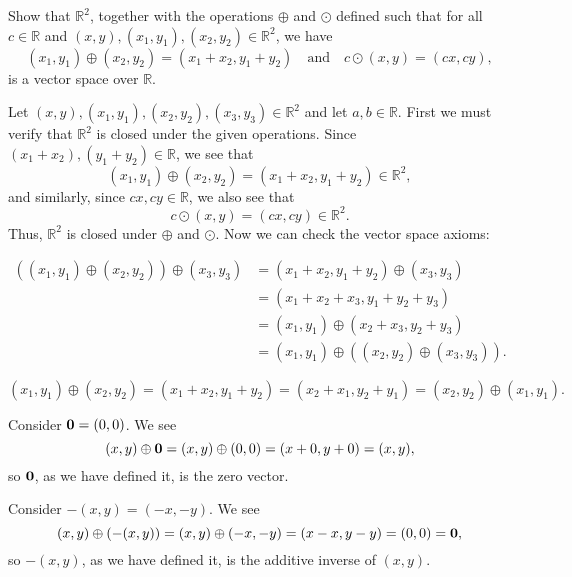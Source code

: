 \begin{example}
Show that $ \mathbb{R}^2 $, together with the operations $ \oplus $ and $ \odot $ defined such that for all $ c\in\mathbb{R} $ and $ (x,y),(x_1,y_1),(x_2,y_2)\in\mathbb{R}^2 $, we have
\begin{equation*}
    (x_1,y_1)\oplus(x_2,y_2)=(x_1+x_2,y_1+y_2) \quad\text{and}\quad c\odot(x,y)=(cx,cy),
\end{equation*}
is a vector space over $ \mathbb{R} $.
\end{example}
\begin{solution}
Let $ (x,y),(x_1,y_1),(x_2,y_2),(x_3,y_3)\in\mathbb{R}^2 $ and let $ a,b\in\mathbb{R} $. First we must verify that $ \mathbb{R}^2 $ is closed under the given operations. Since $ (x_1+x_2),(y_1+y_2)\in\mathbb{R} $, we see that
\begin{equation*}
    (x_1,y_1)\oplus(x_2,y_2)=(x_1+x_2,y_1+y_2)\in\mathbb{R}^2,
\end{equation*}
and similarly, since $ cx,cy\in\mathbb{R} $, we also see that
\begin{equation*}
    c\odot(x,y)=(cx,cy)\in\mathbb{R}^2.
\end{equation*}
Thus, $ \mathbb{R}^2 $ is closed under $ \oplus $ and $ \odot $. Now we can check the vector space axioms:
\begin{enumerate}
    \begin{align*}
        ((x_1,y_1)\oplus(x_2,y_2))\oplus(x_3,y_3) &= (x_1+x_2,y_1+y_2)\oplus(x_3,y_3) \\
        &= (x_1+x_2+x_3,y_1+y_2+y_3) \\
        &= (x_1,y_1)\oplus(x_2+x_3,y_2+y_3) \\
        &= (x_1,y_1)\oplus((x_2,y_2)\oplus(x_3,y_3)).
    \end{align*}

    \begin{equation*}
        (x_1,y_1)\oplus(x_2,y_2)=(x_1+x_2,y_1+y_2)=(x_2+x_1,y_2+y_1)=(x_2,y_2)\oplus(x_1,y_1).
    \end{equation*}

    Consider $ \mathbf{0}=(0,0) $. We see
    \begin{equation*}
        (x,y)\oplus\mathbf{0}=(x,y)\oplus(0,0)=(x+0,y+0)=(x,y),
    \end{equation*}
    so $ \mathbf{0} $, as we have defined it, is the zero vector.

    Consider $ -(x,y)=(-x,-y) $. We see
    \begin{equation*}
        (x,y)\oplus(-(x,y))=(x,y)\oplus(-x,-y)=(x-x,y-y)=(0,0)=\mathbf{0},
    \end{equation*}
    so $ -(x,y) $, as we have defined it, is the additive inverse of $ (x,y) $.


\end{enumerate}
\end{solution}
